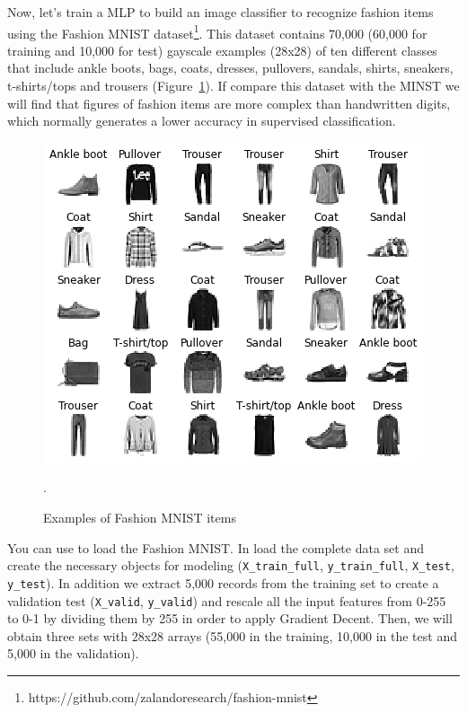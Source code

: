 Now, let's train a MLP to build an image classifier to recognize fashion items using the Fashion MNIST dataset\footnote{https://github.com/zalandoresearch/fashion-mnist}. This dataset contains 70,000 (60,000 for training and 10,000 for test) gayscale examples (28x28) of ten different classes that include ankle boots, bags, coats, dresses, pullovers, sandals, shirts, sneakers, t-shirts/tops and trousers (Figure~\ref{fig:fashion}). If compare this dataset with the MINST we will find that figures of fashion items are more complex than handwritten digits, which normally generates a lower accuracy in supervised classification.

\begin{figure}
\centering
\includegraphics[width=0.9\linewidth]{figures/ch15_fashion.png}
\caption{Examples of Fashion MNIST items}.
\label{fig:fashion}
\end{figure}

You can use  to load the Fashion MNIST. In  load the complete data set and create the necessary objects for modeling (\texttt{X\_train\_full}, \texttt{y\_train\_full}, \texttt{X\_test}, \texttt{y\_test}). In addition we extract 5,000 records from the training set to create a validation test (\texttt{X\_valid}, \texttt{y\_valid}) and rescale all the input features from 0-255 to 0-1 by dividing them by 255 in order to apply Gradient Decent. Then, we will obtain three sets with 28x28 arrays (55,000 in the training, 10,000 in the test and 5,000 in the validation).




